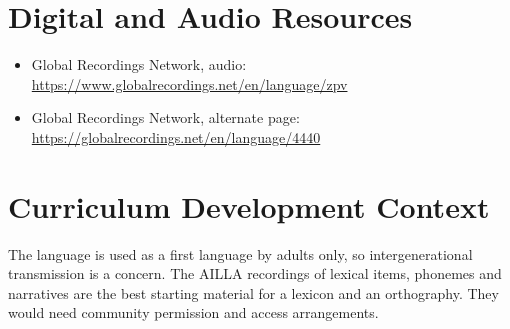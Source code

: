 \documentclass[12pt]{article}
\begin{document}
\section{Digital and Audio Resources}
\begin{itemize}
\item Global Recordings Network, audio: \url{https://www.globalrecordings.net/en/language/zpv}
\item Global Recordings Network, alternate page: \url{https://globalrecordings.net/en/language/4440}
\end{itemize}

\section{Curriculum Development Context}
The language is used as a first language by adults only, so intergenerational transmission is a concern. The AILLA recordings of lexical items, phonemes and narratives are the best starting material for a lexicon and an orthography. They would need community permission and access arrangements.
\end{document}
